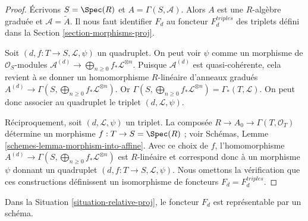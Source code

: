 \begin{proof}
Écrivons $S = \Spec(R)$ et $A = \Gamma(S, \mathcal{A})$.
Alors $A$ est une $R$-algèbre graduée et $\mathcal{A} = \widetilde A$.
Il nous faut identifier $F_d$ au foncteur $F_d^{triples}$ des triplets
défini dans la Section \ref{section-morphisms-proj}.

\medskip\noindent
Soit $(d, f : T \to S, \mathcal{L}, \psi)$ un quadruplet. On peut voir
$\psi$ comme un morphisme de $\mathcal{O}_S$-modules
$\mathcal{A}^{(d)} \to \bigoplus_{n \geq 0} f_*\mathcal{L}^{\otimes n}$.
Puisque $\mathcal{A}^{(d)}$ est quasi-cohérente, cela revient à se donner
un homomorphisme $R$-linéaire d'anneaux gradués
$A^{(d)} \to \Gamma(S, \bigoplus_{n \geq 0} f_*\mathcal{L}^{\otimes n})$.
Or
$\Gamma(S, \bigoplus_{n \geq 0} f_*\mathcal{L}^{\otimes n}) =
\Gamma_*(T, \mathcal{L})$.
On peut donc associer au quadruplet le triplet $(d, \mathcal{L}, \psi)$.

\medskip\noindent
Réciproquement, soit $(d, \mathcal{L}, \psi)$ un triplet.
La composée $R \to A_0 \to \Gamma(T, \mathcal{O}_T)$ détermine un morphisme
$f : T \to S = \Spec(R)$ ; voir Schémas,
Lemme \ref{schemes-lemma-morphism-into-affine}. Avec ce choix de $f$,
l'homomorphisme
$A^{(d)} \to \Gamma(S, \bigoplus_{n \geq 0} f_*\mathcal{L}^{\otimes n})$
est $R$-linéaire et correspond donc à un morphisme $\psi$ donnant un
quadruplet $(d, f : T \to S, \mathcal{L}, \psi)$.
Nous omettons la vérification que ces constructions définissent un
isomorphisme de foncteurs $F_d = F_d^{triples}$.
\end{proof}

\begin{lemma}
\label{lemma-relative-proj-d}
Dans la Situation \ref{situation-relative-proj}, le foncteur $F_d$ est
représentable par un schéma.
\end{lemma}

